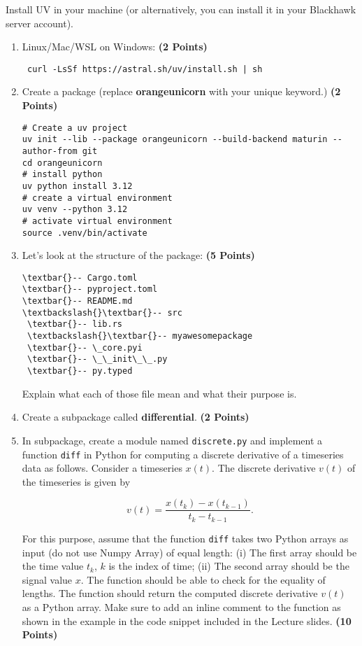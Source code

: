 \documentclass[12pt, xcolor=dvipsnames,svgnames,x11names]{article}
\begin{document}
Install UV in your machine (or alternatively, you can install it in your Blackhawk server account).
\begin{enumerate}
   \item Linux/Mac/WSL on Windows: \hfill \textbf{(2 Points)}
   \begin{verbatim}
 curl -LsSf https://astral.sh/uv/install.sh | sh
   \end{verbatim}

   \item Create a package (replace \textbf{orangeunicorn} with your unique keyword.) \hfill \textbf{(2 Points)}
   \begin{verbatim}
# Create a uv project
uv init --lib --package orangeunicorn --build-backend maturin --author-from git
cd orangeunicorn
# install python
uv python install 3.12
# create a virtual environment
uv venv --python 3.12
# activate virtual environment
source .venv/bin/activate
\end{verbatim}

\item Let's look at the structure of the package: \hfill \textbf{(5 Points)}

\begin{Verbatim}[commandchars=\\\{\}]
\textbar{}-- Cargo.toml
\textbar{}-- pyproject.toml
\textbar{}-- README.md
\textbackslash{}\textbar{}-- src
 \textbar{}-- lib.rs
 \textbackslash{}\textbar{}-- myawesomepackage
 \textbar{}-- \_core.pyi
 \textbar{}-- \_\_init\_\_.py
 \textbar{}-- py.typed
\end{Verbatim}

Explain what each of those file mean and what their purpose is.

\item Create a subpackage called \textbf{differential}. \hfill \textbf{(2 Points)}
\item In subpackage, create a module named \texttt{discrete.py} and implement a function \texttt{diff} in Python for computing a discrete derivative of a timeseries data as follows. Consider a timeseries $x(t)$. The discrete derivative $v(t)$ of the timeseries is given by 

$$
v(t) = \frac{x(t_k) - x(t_{k-1})}{t_k - t_{k-1}}.
$$

For this purpose, assume that the function \texttt{diff} takes two Python arrays as input (do not use Numpy Array) of equal length: (i) The first array should be the time value $t_k$, $k$ is the index of time; (ii) The second array should be the signal value $x$. The function should be able to check for the equality of lengths. The function should return the computed discrete derivative $v(t)$ as a Python array. Make sure to add an inline comment to the function as shown in the example in the code snippet included in the Lecture slides. \hfill \textbf{(10 Points)}


\end{enumerate}
\end{document}
